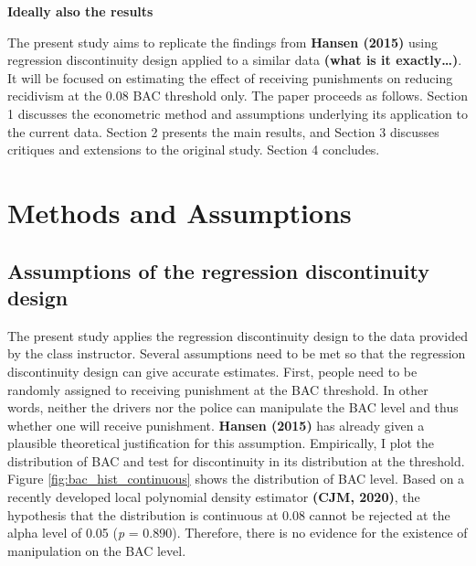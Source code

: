 \documentclass[
  11pt,
]{article}
\begin{document}
\textbf{Ideally also the results}

The present study aims to replicate the findings from \textbf{Hansen
(2015)} using regression discontinuity design applied to a similar data
\textbf{(what is it exactly\ldots)}. It will be focused on estimating
the effect of receiving punishments on reducing recidivism at the 0.08
BAC threshold only. The paper proceeds as follows. Section 1 discusses
the econometric method and assumptions underlying its application to the
current data. Section 2 presents the main results, and Section 3
discusses critiques and extensions to the original study. Section 4
concludes.

\hypertarget{methods-and-assumptions}{%
\section{Methods and Assumptions}\label{methods-and-assumptions}}

\hypertarget{assumptions-of-the-regression-discontinuity-design}{%
\subsection{Assumptions of the regression discontinuity
design}\label{assumptions-of-the-regression-discontinuity-design}}

The present study applies the regression discontinuity design to the
data provided by the class instructor. Several assumptions need to be
met so that the regression discontinuity design can give accurate
estimates. First, people need to be randomly assigned to receiving
punishment at the BAC threshold. In other words, neither the drivers nor
the police can manipulate the BAC level and thus whether one will
receive punishment. \textbf{Hansen (2015)} has already given a plausible
theoretical justification for this assumption. Empirically, I plot the
distribution of BAC and test for discontinuity in its distribution at
the threshold. Figure \ref{fig:bac_hist_continuous} shows the
distribution of BAC level. Based on a recently developed local
polynomial density estimator \textbf{(CJM, 2020)}, the hypothesis that
the distribution is continuous at 0.08 cannot be rejected at the alpha
level of 0.05 (\emph{p} = 0.890). Therefore, there is no evidence for
the existence of manipulation on the BAC level.
\end{document}
